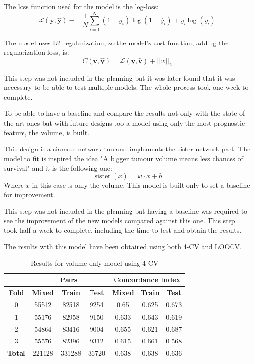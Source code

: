 The loss function used for the model is the log-loss:
\[
  \mathcal{L}(\bm{y}, \hat{\bm{y}}) = -\frac{1}{N} \sum_{i = 1}^{N}
  (1 - y_i)\log(1 - \hat{y}_i) + y_i\log(\hat{y}_i)
\]

The model uses L2 regularization, so the model's cost function, 
adding the regularization loss, is:
\[
  C(\bm{y}, \hat{\bm{y}}) = \mathcal{L}(\bm{y}, \hat{\bm{y}}) + 
  ||w||_2
\]

This step was not included in the planning but it was later found that it was necessary to be 
able to test multiple models. The whole process took one week to complete.


To be able to have a baseline and compare the results not only with the state-of-the art ones
but with future designs too a model using only the most prognostic feature, the volume, is 
built.

This design is a siamese network too and implements the sister network part. The model to fit
is inspired the idea "A bigger tumour volume means less chances of 
survival" and it is the following one:
\[
  \operatorname{sister}(x) = w\cdot x + b
\]
Where \( x \) in this case is only the volume. This model is built only to set a 
baseline for improvement.

This step was not included in the planning but having a baseline was required to see the 
improvement of the new models compared against this one. This step took half a week to complete,
including the time to test and obtain the results.


The results with this model have been obtained using both 4-CV and \gls{LOOCV}.

\begin{table}
  \centering
  \begin{tabular}{|c||c|c|c||c|c|c|}
    \cline{2-7}
    \multicolumn{1}{c|}{} & \multicolumn{3}{|c||}{\textbf{Pairs}} & 
    \multicolumn{3}{c|}{\textbf{Concordance Index}} \\
    \hline
    \textbf{Fold} & \textbf{Mixed} & \textbf{Train} & \textbf{Test} 
    & \textbf{Mixed} & \textbf{Train} & \textbf{Test} \\
    \hhline{=======}
    0 & 55512 & 82518 & 9254 & 0.65 & 0.625 & 0.673 \\
    1 & 55176 & 82958 & 9150 & 0.633 & 0.643 & 0.619 \\
    2 & 54864 & 83416 & 9004 & 0.655 & 0.621 & 0.687 \\
    3 & 55576 & 82396 & 9312 & 0.615 & 0.661 & 0.568 \\
    \hhline{=======}
    \textbf{Total} & 221128 & 331288 & 36720 & 0.638 & 0.638 & 0.636 \\
    \hline
  \end{tabular}

  \caption{Results for volume only model using 4-CV \label{tab:volume-4CV}}
\end{table}

